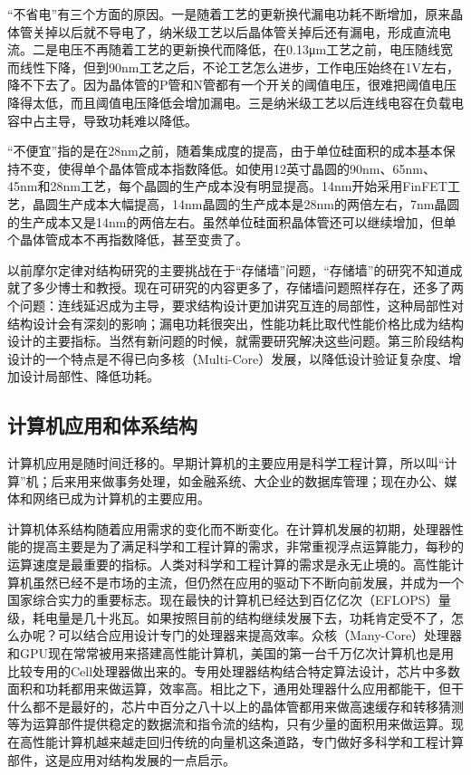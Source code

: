 \documentclass[]{ctexbook}
\begin{document}
``不省电''有三个方面的原因。一是随着工艺的更新换代漏电功耗不断增加，原来晶体管关掉以后就不导电了，纳米级工艺以后晶体管关掉后还有漏电，形成直流电流。二是电压不再随着工艺的更新换代而降低，在0.13μm工艺之前，电压随线宽而线性下降，但到90nm工艺之后，不论工艺怎么进步，工作电压始终在1V左右，降不下去了。因为晶体管的P管和N管都有一个开关的阈值电压，很难把阈值电压降得太低，而且阈值电压降低会增加漏电。三是纳米级工艺以后连线电容在负载电容中占主导，导致功耗难以降低。

``不便宜''指的是在28nm之前，随着集成度的提高，由于单位硅面积的成本基本保持不变，使得单个晶体管成本指数降低。如使用12英寸晶圆的90nm、65nm、45nm和28nm工艺，每个晶圆的生产成本没有明显提高。14nm开始采用FinFET工艺，晶圆生产成本大幅提高，14nm晶圆的生产成本是28nm的两倍左右，7nm晶圆的生产成本又是14nm的两倍左右。虽然单位硅面积晶体管还可以继续增加，但单个晶体管成本不再指数降低，甚至变贵了。

以前摩尔定律对结构研究的主要挑战在于``存储墙''问题，``存储墙''的研究不知道成就了多少博士和教授。现在可研究的内容更多了，存储墙问题照样存在，还多了两个问题：连线延迟成为主导，要求结构设计更加讲究互连的局部性，这种局部性对结构设计会有深刻的影响；漏电功耗很突出，性能功耗比取代性能价格比成为结构设计的主要指标。当然有新问题的时候，就需要研究解决这些问题。第三阶段结构设计的一个特点是不得已向多核（Multi-Core）发展，以降低设计验证复杂度、增加设计局部性、降低功耗。

\hypertarget{ux8ba1ux7b97ux673aux5e94ux7528ux548cux4f53ux7cfbux7ed3ux6784}{%
\subsection{计算机应用和体系结构}\label{ux8ba1ux7b97ux673aux5e94ux7528ux548cux4f53ux7cfbux7ed3ux6784}}

计算机应用是随时间迁移的。早期计算机的主要应用是科学工程计算，所以叫``计算''机；后来用来做事务处理，如金融系统、大企业的数据库管理；现在办公、媒体和网络已成为计算机的主要应用。

计算机体系结构随着应用需求的变化而不断变化。在计算机发展的初期，处理器性能的提高主要是为了满足科学和工程计算的需求，非常重视浮点运算能力，每秒的运算速度是最重要的指标。人类对科学和工程计算的需求是永无止境的。高性能计算机虽然已经不是市场的主流，但仍然在应用的驱动下不断向前发展，并成为一个国家综合实力的重要标志。现在最快的计算机已经达到百亿亿次（EFLOPS）量级，耗电量是几十兆瓦。如果按照目前的结构继续发展下去，功耗肯定受不了，怎么办呢？可以结合应用设计专门的处理器来提高效率。众核（Many-Core）处理器和GPU现在常常被用来搭建高性能计算机，美国的第一台千万亿次计算机也是用比较专用的Cell处理器做出来的。专用处理器结构结合特定算法设计，芯片中多数面积和功耗都用来做运算，效率高。相比之下，通用处理器什么应用都能干，但干什么都不是最好的，芯片中百分之八十以上的晶体管都用来做高速缓存和转移猜测等为运算部件提供稳定的数据流和指令流的结构，只有少量的面积用来做运算。现在高性能计算机越来越走回归传统的向量机这条道路，专门做好多科学和工程计算部件，这是应用对结构发展的一点启示。
\end{document}
